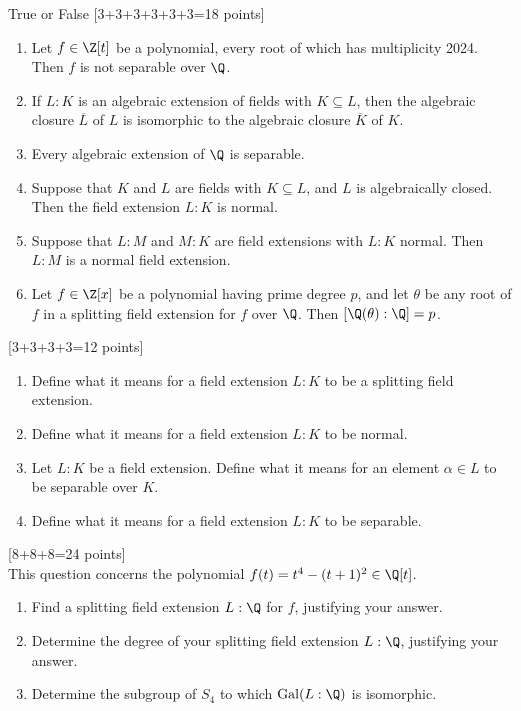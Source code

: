 \documentclass{article}
\begin{document}
\setcounter{section}{2}
 True or False \hfill [3+3+3+3+3+3=18 points]
\begin{enumerate}[label=(\alph*)]
  \item Let \( f \in \Z[t] \) be a polynomial, every root of which has multiplicity 2024. Then \( f \) is not separable over \( \Q \).\vfill
  \item If \( L : K \) is an algebraic extension of fields with \( K \subseteq L \), then the algebraic closure \( \overline{L} \) of \( L \) is isomorphic to the algebraic closure \( \overline{K} \) of \( K \).\vfill
  \item Every algebraic extension of \( \Q \) is separable.\vfill
  \item Suppose that \( K \) and \( L \) are fields with \( K \subseteq L \), and \( L \) is algebraically closed. Then the field extension \( L : K \) is normal.\vfill
  \item Suppose that \( L : M \) and \( M : K \) are field extensions with \( L : K \) normal. Then \( L : M \) is a normal field extension.\vfill
  \item Let \( f \in \Z[x] \) be a polynomial having prime degree \( p \), and let \( \theta \) be any root of \( f \) in a splitting field extension for \( f \) over \( \Q \). Then \( [\Q(\theta) : \Q] = p \).\vspace{0.16\textheight}
\end{enumerate}
\pagebreak

 \hfill [3+3+3+3=12 points]
\begin{enumerate}[label=(\alph*)]
  \item Define what it means for a field extension \( L : K \) to be a splitting field extension.
    \vfill
  \item Define what it means for a field extension \( L : K \) to be normal.
  \vspace{0.5\textheight}
  \pagebreak
  \item Let \( L : K \) be a field extension. Define what it means for an element \( \alpha \in L \) to be separable over \( K \).
  \vfill
  \item Define what it means for a field extension \( L : K \) to be separable.
  \vspace{0.5\textheight}
\end{enumerate}
\pagebreak

 \hfill [8+8+8=24 points] \\
This question concerns the polynomial \( f(t) = t^4 - (t+1)^2 \in \Q[t] \).
\begin{enumerate}[label=(\alph*)]
  \item Find a splitting field extension \( L : \Q \) for \( f \), justifying your answer.
    \pagebreak
  \item Determine the degree of your splitting field extension \( L : \Q \), justifying your answer.
    \pagebreak
  \item Determine the subgroup of \( S_4 \) to which \( \mathrm{Gal}(L : \Q) \) is isomorphic.
\end{enumerate}
\pagebreak
\end{document}
